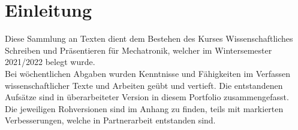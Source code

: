 \chapter{Einleitung}
Diese Sammlung an Texten dient dem Bestehen des Kurses Wissenschaftliches Schreiben und Präsentieren für Mechatronik, welcher im Wintersemester 2021/2022 belegt wurde. \\
Bei wöchentlichen Abgaben wurden Kenntnisse und Fähigkeiten im Verfassen wissenschaftlicher Texte und Arbeiten geübt und vertieft. Die entstandenen Aufsätze sind in überarbeiteter Version in diesem Portfolio zusammengefasst. \\
Die jeweiligen Rohversionen sind im Anhang zu finden, teils mit markierten Verbesserungen, welche in Partnerarbeit entstanden sind.\\
